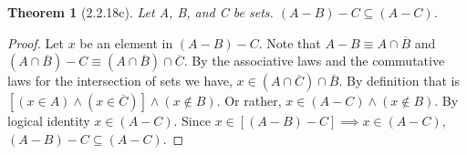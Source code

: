 \documentclass[a4paper, 12pt]{article}
\theoremstyle{plain}
\newtheorem*{theorem*}{Theorem}
\begin{document}
	
	\begin{theorem*}[2.2.18c]
		Let A, B, and C be sets. $(A - B) - C \subseteq (A - C)$.
	\end{theorem*}
	
	\begin{proof}
		Let $x$ be an element in $(A - B) - C$. Note that $A - B \equiv A \cap \overline{B}$ and 
		$(A \cap \overline{B}) - C \equiv (A \cap \overline{B}) \cap \overline{C}$. By the 
		associative laws and the commutative laws for the intersection of sets we have, 
		$x \in (A \cap \overline{C}) \cap \overline{B}$. By definition that is 
		$[(x \in A) \land (x \in \overline{C})] \land (x \notin B)$. Or rather, 
		$x \in (A - C) \land (x \notin B)$. By logical identity $x \in (A - C)$. Since 
		$x \in [(A - B) - C] \implies x \in (A - C)$, $(A - B) - C \subseteq (A - C)$.
	\end{proof}
\end{document}
